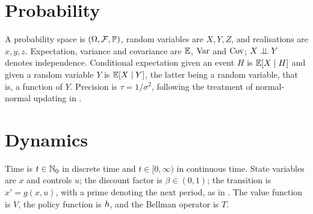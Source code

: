 \section*{Probability}

A probability space is $(\Omega,\mathcal{F},\mathbb{P})$, random variables are
$X,Y,Z$, and realisations are $x,y,z$. Expectation, variance and covariance are
$\mathbb{E}$, $\operatorname{Var}$ and $\operatorname{Cov}$; $X\mathrel{\perp\!\!\!\perp} Y$ denotes independence. Conditional
expectation given an event $H$ is $\mathbb{E}[X\mid H]$ and given a random variable $Y$
is $\mathbb{E}[X\mid Y]$, the latter being a random variable, that is, a function of $Y$.
Precision is $\tau=1/\sigma^2$, following the treatment of normal-normal updating
in \autocite[slides 27--28]{fukuda2026probability}.

\section*{Dynamics}

Time is $t\in\mathbb{N}_0$ in discrete time and $t\in[0,\infty)$ in continuous time.
State variables are $x$ and controls $u$; the discount factor is
$\beta\in(0,1)$; the transition is $x'=g(x,u)$, with a prime denoting the
next period, as in \autocite[slide 8]{fukuda2026dynamic}. The value function is
$V$, the policy function is $h$, and the Bellman operator is $T$.
